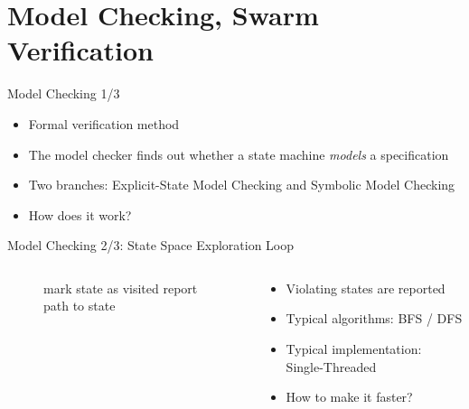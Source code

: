 \documentclass[aspectratio=169]{beamer}
\begin{document}
\section{Model Checking, Swarm Verification}

\begin{frame}{Model Checking 1/3}
    \begin{itemize}
        \item Formal verification method
        \item The model checker finds out whether a state machine \emph{models} a specification
        \item Two branches: Explicit-State Model Checking and Symbolic Model Checking
        \item How does it work?
    \end{itemize}
\end{frame}

\begin{frame}{Model Checking 2/3: State Space Exploration Loop}
    \begin{columns}
        \begin{column}{.5\textwidth}
            \begin{figure}
                \centering\begin{algorithmic}
                    \State mark state as visited
                    \State report path to state
                    \EndIf
                    \EndWhile
                \end{algorithmic}
            \end{figure}
        \end{column}
        \begin{column}{.5\textwidth}
            \begin{itemize}
                \item Violating states are reported
                \item Typical algorithms: BFS / DFS
                \item Typical implementation: Single-Threaded
                \item How to make it faster?
            \end{itemize}
        \end{column}
    \end{columns}
\end{frame}
\end{document}
